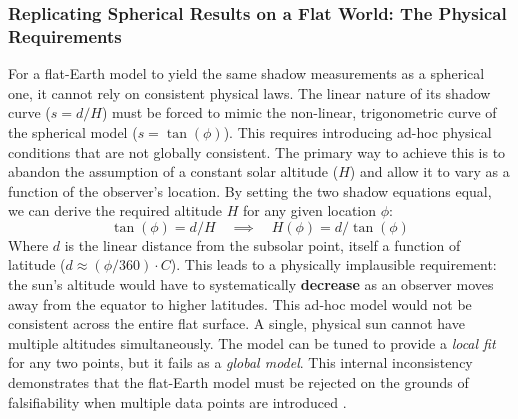 \documentclass[11pt]{article}
\begin{document}
\subsubsection{Replicating Spherical Results on a Flat World: The Physical Requirements}
For a flat-Earth model to yield the same shadow measurements as a spherical one, it cannot rely on consistent physical laws. The linear nature of its shadow curve ($s = d/H$) must be forced to mimic the non-linear, trigonometric curve of the spherical model ($s = \tan(\phi)$). This requires introducing ad-hoc physical conditions that are not globally consistent. The primary way to achieve this is to abandon the assumption of a constant solar altitude ($H$) and allow it to vary as a function of the observer's location. By setting the two shadow equations equal, we can derive the required altitude $H$ for any given location $\phi$:
\begin{equation}
    \tan(\phi) = d/H \quad \implies \quad H(\phi) = d / \tan(\phi)
    \label{eq:H_phi}
\end{equation}
Where $d$ is the linear distance from the subsolar point, itself a function of latitude ($d \approx (\phi/360) \cdot C$). This leads to a physically implausible requirement: the sun's altitude would have to systematically \textbf{decrease} as an observer moves away from the equator to higher latitudes. This ad-hoc model would not be consistent across the entire flat surface. A single, physical sun cannot have multiple altitudes simultaneously. The model can be tuned to provide a \textit{local fit} for any two points, but it fails as a \textit{global model}. This internal inconsistency demonstrates that the flat-Earth model must be rejected on the grounds of falsifiability when multiple data points are introduced \cite{Popper1959}.
\end{document}
